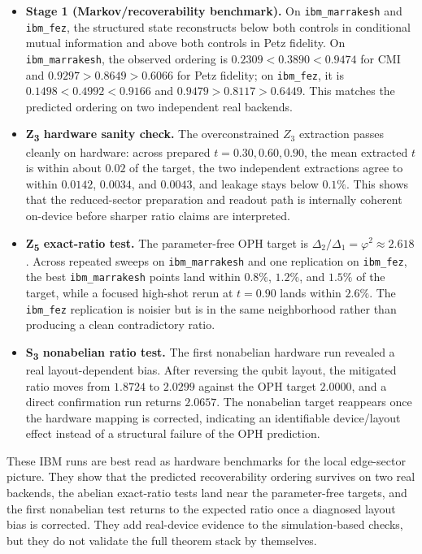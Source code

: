 \begin{itemize}
\tightlist
\item
  \textbf{Stage 1 (Markov/recoverability benchmark).} On \texttt{ibm\_marrakesh} and \texttt{ibm\_fez}, the structured state reconstructs below both controls in conditional mutual information and above both controls in Petz fidelity. On \texttt{ibm\_marrakesh}, the observed ordering is \(0.2309 < 0.3890 < 0.9474\) for CMI and \(0.9297 > 0.8649 > 0.6066\) for Petz fidelity; on \texttt{ibm\_fez}, it is \(0.1498 < 0.4992 < 0.9166\) and \(0.9479 > 0.8117 > 0.6449\). This matches the predicted ordering on two independent real backends.
\item
  \textbf{Z\textsubscript{3} hardware sanity check.} The overconstrained \(Z_3\) extraction passes cleanly on hardware: across prepared \(t = 0.30, 0.60, 0.90\), the mean extracted \(t\) is within about \(0.02\) of the target, the two independent extractions agree to within \(0.0142\), \(0.0034\), and \(0.0043\), and leakage stays below \(0.1\%\). This shows that the reduced-sector preparation and readout path is internally coherent on-device before sharper ratio claims are interpreted.
\item
  \textbf{Z\textsubscript{5} exact-ratio test.} The parameter-free OPH target is \(\Delta_2/\Delta_1 = \varphi^2 \approx 2.618\). Across repeated sweeps on \texttt{ibm\_marrakesh} and one replication on \texttt{ibm\_fez}, the best \texttt{ibm\_marrakesh} points land within \(0.8\%\), \(1.2\%\), and \(1.5\%\) of the target, while a focused high-shot rerun at \(t = 0.90\) lands within \(2.6\%\). The \texttt{ibm\_fez} replication is noisier but is in the same neighborhood rather than producing a clean contradictory ratio.
\item
  \textbf{S\textsubscript{3} nonabelian ratio test.} The first nonabelian hardware run revealed a real layout-dependent bias. After reversing the qubit layout, the mitigated ratio moves from \(1.8724\) to \(2.0299\) against the OPH target \(2.0000\), and a direct confirmation run returns \(2.0657\). The nonabelian target reappears once the hardware mapping is corrected, indicating an identifiable device/layout effect instead of a structural failure of the OPH prediction.
\end{itemize}

These IBM runs are best read as hardware benchmarks for the local edge-sector picture. They show that the predicted recoverability ordering survives on two real backends, the abelian exact-ratio tests land near the parameter-free targets, and the first nonabelian test returns to the expected ratio once a diagnosed layout bias is corrected. They add real-device evidence to the simulation-based checks, but they do not validate the full theorem stack by themselves.

